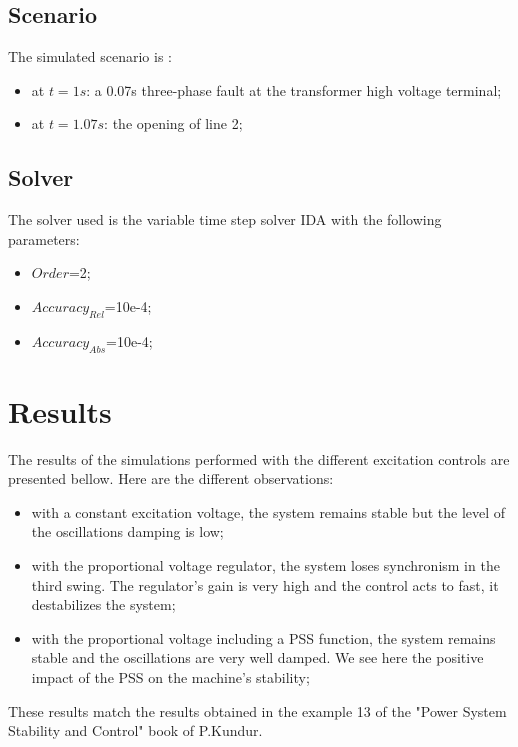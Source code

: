 \documentclass[a4paper, 12pt]{report}
\begin{document}
\subsection{Scenario}
The simulated scenario is :
\begin{itemize}
\item at $t=1s$: a 0.07s three-phase fault at the transformer high voltage terminal;
\item at $t=1.07s$: the opening of line 2;
\end{itemize}

\subsection{Solver}
The solver used is the variable time step solver IDA with the following parameters:
\begin{itemize}
\item $Order$=2;
\item $Accuracy_{Rel}$=10e-4;
\item $Accuracy_{Abs}$=10e-4;
\end{itemize}

\section{Results}

The results of the simulations performed with the different excitation controls are presented bellow. Here are the different observations:
\begin{itemize}
\item with a constant excitation voltage, the system remains stable but the level of the oscillations damping is low;
\item with the proportional voltage regulator, the system loses synchronism in the third swing. The regulator's gain is very high and the control acts to fast, it destabilizes the system;
\item with the proportional voltage including a PSS function, the system remains stable and the oscillations are very well damped. We see here the positive impact of the PSS on the machine's stability;
\end{itemize}

These results match the results obtained in the example 13 of the "Power System Stability and Control" book of P.Kundur.
\end{document}
